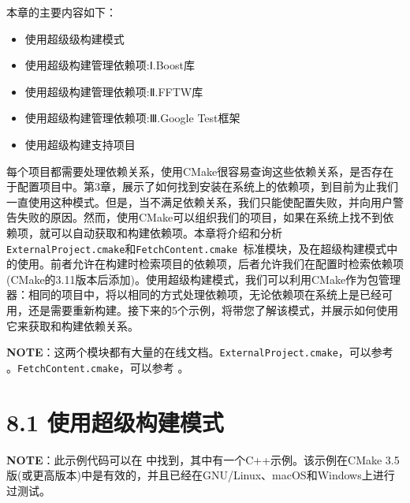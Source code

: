 本章的主要内容如下：

\begin{itemize}
\item 使用超级级构建模式

\item 使用超级构建管理依赖项:Ⅰ.Boost库

\item 使用超级构建管理依赖项:Ⅱ.FFTW库

\item 使用超级构建管理依赖项:Ⅲ.Google Test框架

\item 使用超级构建支持项目

\end{itemize}

每个项目都需要处理依赖关系，使用CMake很容易查询这些依赖关系，是否存在于配置项目中。第3章，展示了如何找到安装在系统上的依赖项，到目前为止我们一直使用这种模式。但是，当不满足依赖关系，我们只能使配置失败，并向用户警告失败的原因。然而，使用CMake可以组织我们的项目，如果在系统上找不到依赖项，就可以自动获取和构建依赖项。本章将介绍和分析\texttt{ ExternalProject.cmake}和\texttt{FetchContent.cmake }标准模块，及在超级构建模式中的使用。前者允许在构建时检索项目的依赖项，后者允许我们在配置时检索依赖项(CMake的3.11版本后添加)。使用超级构建模式，我们可以利用CMake作为包管理器：相同的项目中，将以相同的方式处理依赖项，无论依赖项在系统上是已经可用，还是需要重新构建。接下来的5个示例，将带您了解该模式，并展示如何使用它来获取和构建依赖关系。

\begin{myInfoBox}
\textbf{NOTE}：这两个模块都有大量的在线文档。\texttt{ExternalProject.cmake}，可以参考 。\texttt{FetchContent.cmake}，可以参考 。
\end{myInfoBox}


\section{8.1 使用超级构建模式}

\begin{myInfoBox}
\textbf{NOTE}：此示例代码可以在  中找到，其中有一个C++示例。该示例在CMake 3.5版(或更高版本)中是有效的，并且已经在GNU/Linux、macOS和Windows上进行过测试。
\end{myInfoBox}


